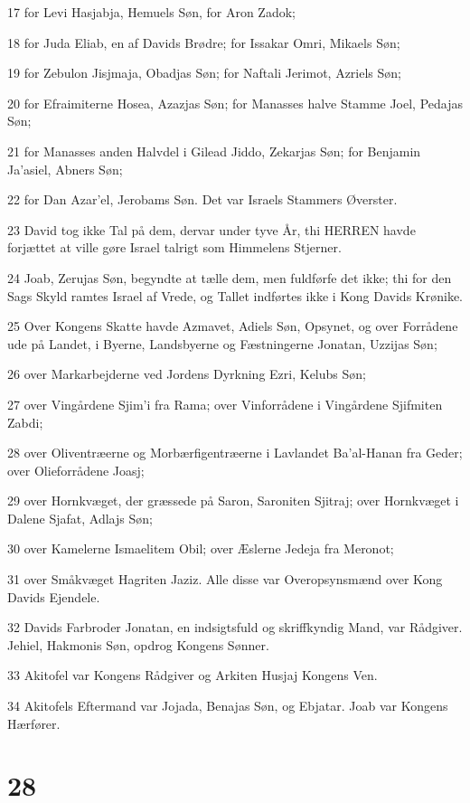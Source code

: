 \par 17 for Levi Hasjabja, Hemuels Søn, for Aron Zadok;
\par 18 for Juda Eliab, en af Davids Brødre; for Issakar Omri, Mikaels Søn;
\par 19 for Zebulon Jisjmaja, Obadjas Søn; for Naftali Jerimot, Azriels Søn;
\par 20 for Efraimiterne Hosea, Azazjas Søn; for Manasses halve Stamme Joel, Pedajas Søn;
\par 21 for Manasses anden Halvdel i Gilead Jiddo, Zekarjas Søn; for Benjamin Ja'asiel, Abners Søn;
\par 22 for Dan Azar'el, Jerobams Søn. Det var Israels Stammers Øverster.
\par 23 David tog ikke Tal på dem, dervar under tyve År, thi HERREN havde forjættet at ville gøre Israel talrigt som Himmelens Stjerner.
\par 24 Joab, Zerujas Søn, begyndte at tælle dem, men fuldførfe det ikke; thi for den Sags Skyld ramtes Israel af Vrede, og Tallet indførtes ikke i Kong Davids Krønike.
\par 25 Over Kongens Skatte havde Azmavet, Adiels Søn, Opsynet, og over Forrådene ude på Landet, i Byerne, Landsbyerne og Fæstningerne Jonatan, Uzzijas Søn;
\par 26 over Markarbejderne ved Jordens Dyrkning Ezri, Kelubs Søn;
\par 27 over Vingårdene Sjim'i fra Rama; over Vinforrådene i Vingårdene Sjifmiten Zabdi;
\par 28 over Oliventræerne og Morbærfigentræerne i Lavlandet Ba'al-Hanan fra Geder; over Olieforrådene Joasj;
\par 29 over Hornkvæget, der græssede på Saron, Saroniten Sjitraj; over Hornkvæget i Dalene Sjafat, Adlajs Søn;
\par 30 over Kamelerne Ismaelitem Obil; over Æslerne Jedeja fra Meronot;
\par 31 over Småkvæget Hagriten Jaziz. Alle disse var Overopsynsmænd over Kong Davids Ejendele.
\par 32 Davids Farbroder Jonatan, en indsigtsfuld og skriffkyndig Mand, var Rådgiver. Jehiel, Hakmonis Søn, opdrog Kongens Sønner.
\par 33 Akitofel var Kongens Rådgiver og Arkiten Husjaj Kongens Ven.
\par 34 Akitofels Eftermand var Jojada, Benajas Søn, og Ebjatar. Joab var Kongens Hærfører.

\chapter{28}

